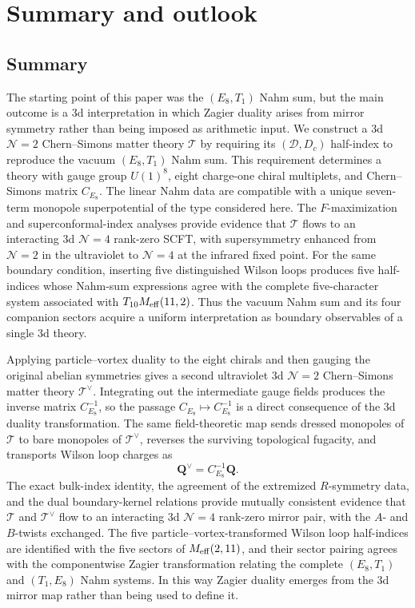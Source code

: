 \documentclass[11pt,a4paper]{article}
\numberwithin{equation}{section}
\begin{document}
\section{Summary and outlook}
\label{sec:summary-outlooks}

\subsection{Summary}

The starting point of this paper was the $(E_8,T_1)$ Nahm sum, but the main outcome is a 3d interpretation in which Zagier duality arises from mirror symmetry rather than being imposed as arithmetic input.  We construct a 3d $\mathcal N=2$ Chern--Simons matter theory $\mathcal T$ by requiring its $(\mathcal D,D_c)$ half-index to reproduce the vacuum $(E_8,T_1)$ Nahm sum.  This requirement determines a theory with gauge group $U(1)^8$, eight charge-one chiral multiplets, and Chern--Simons matrix $C_{E_8}$.  The linear Nahm data are compatible with a unique seven-term monopole superpotential of the type considered here.  The $F$-maximization and superconformal-index analyses provide evidence that $\mathcal T$ flows to an interacting 3d $\mathcal N=4$ rank-zero SCFT, with supersymmetry enhanced from $\mathcal N=2$ in the ultraviolet to $\mathcal N=4$ at the infrared fixed point.  For the same boundary condition, inserting five distinguished Wilson loops produces five half-indices whose Nahm-sum expressions agree with the complete five-character system associated with $T_{10}M_{\rm eff}(11,2)$.  Thus the vacuum Nahm sum and its four companion sectors acquire a uniform interpretation as boundary observables of a single 3d theory.

Applying particle--vortex duality to the eight chirals and then gauging the original abelian symmetries gives a second ultraviolet 3d $\mathcal N=2$ Chern--Simons matter theory $\mathcal T^\vee$.  Integrating out the intermediate gauge fields produces the inverse matrix $C_{E_8}^{-1}$, so the passage $C_{E_8}\mapsto C_{E_8}^{-1}$ is a direct consequence of the 3d duality transformation.  The same field-theoretic map sends dressed monopoles of $\mathcal T$ to bare monopoles of $\mathcal T^\vee$, reverses the surviving topological fugacity, and transports Wilson loop charges as
\begin{equation}
  \boldsymbol Q^\vee=C_{E_8}^{-1}\boldsymbol Q.
  \label{eq:summary-Wilson-transmission}
\end{equation}
The exact bulk-index identity, the agreement of the extremized $R$-symmetry data, and the dual boundary-kernel relations provide mutually consistent evidence that $\mathcal T$ and $\mathcal T^\vee$ flow to an interacting 3d $\mathcal N=4$ rank-zero mirror pair, with the $A$- and $B$-twists exchanged.  The five particle--vortex-transformed Wilson loop half-indices are identified with the five sectors of $M_{\rm eff}(2,11)$, and their sector pairing agrees with the componentwise Zagier transformation relating the complete $(E_8,T_1)$ and $(T_1,E_8)$ Nahm systems.  In this way Zagier duality emerges from the 3d mirror map rather than being used to define it.
\end{document}

